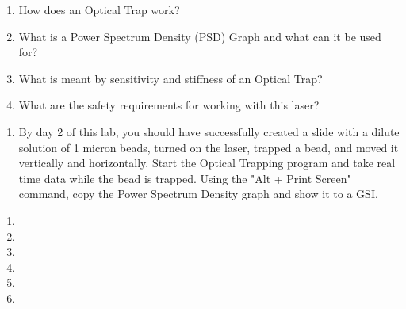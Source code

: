 \documentclass{../signatures}
\begin{document}
\maketitle

\names

\prelab

\begin{enumerate}

    \item How does an Optical Trap work?
    
    \item What is a Power Spectrum Density (PSD) Graph and what can it be used for?

    \item What is meant by sensitivity and stiffness of an Optical Trap?

    \item What are the safety requirements for working with this laser?
       \\[36pt]
\end{enumerate}

\prelabsignatures

\midlab

\begin{enumerate}

    \item By day 2 of this lab, you should have successfully created a slide with a dilute solution of 1 micron beads, turned on the laser, trapped a bead, and moved it vertically and horizontally. Start the Optical Trapping program and take real time data while the bead is trapped. Using the "Alt + Print Screen" command, copy the Power Spectrum Density graph and show it to a GSI.
\\[36pt]
\end{enumerate}


\pagebreak

\checkpointsection 

\begin{enumerate}

\item {}

\item {}

\item {}

\item {}

\item {}

\item {}

\end{enumerate}
\end{document}
